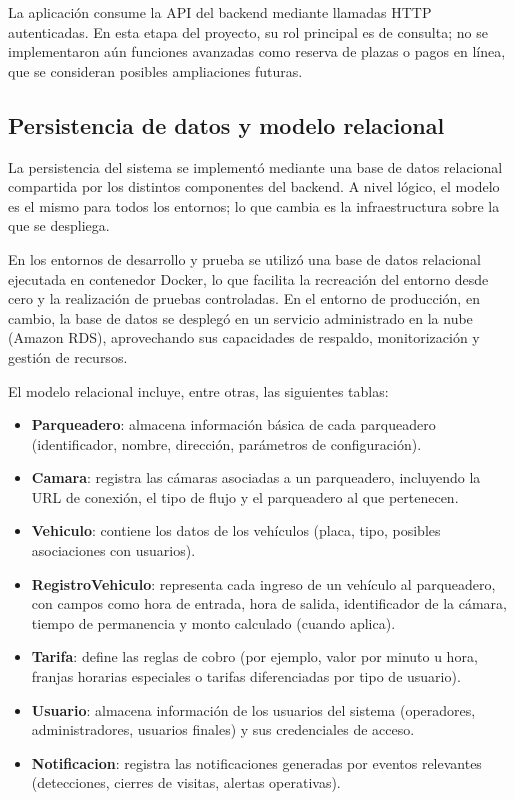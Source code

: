 La aplicación consume la API del backend mediante llamadas HTTP autenticadas. En esta etapa del proyecto, su rol principal es de consulta; no se implementaron aún funciones avanzadas como reserva de plazas o pagos en línea, que se consideran posibles ampliaciones futuras.
\subsection{Persistencia de datos y modelo relacional}

La persistencia del sistema se implementó mediante una base de datos relacional compartida por los distintos componentes del backend. A nivel lógico, el modelo es el mismo para todos los entornos; lo que cambia es la infraestructura sobre la que se despliega.

En los entornos de desarrollo y prueba se utilizó una base de datos relacional ejecutada en contenedor Docker, lo que facilita la recreación del entorno desde cero y la realización de pruebas controladas. En el entorno de producción, en cambio, la base de datos se desplegó en un servicio administrado en la nube (Amazon RDS), aprovechando sus capacidades de respaldo, monitorización y gestión de recursos.

El modelo relacional incluye, entre otras, las siguientes tablas:

\begin{itemize}
    \item \textbf{Parqueadero}: almacena información básica de cada parqueadero (identificador, nombre, dirección, parámetros de configuración).
    \item \textbf{Camara}: registra las cámaras asociadas a un parqueadero, incluyendo la URL de conexión, el tipo de flujo y el parqueadero al que pertenecen.
    \item \textbf{Vehiculo}: contiene los datos de los vehículos (placa, tipo, posibles asociaciones con usuarios).
    \item \textbf{RegistroVehiculo}: representa cada ingreso de un vehículo al parqueadero, con campos como hora de entrada, hora de salida, identificador de la cámara, tiempo de permanencia y monto calculado (cuando aplica).
    \item \textbf{Tarifa}: define las reglas de cobro (por ejemplo, valor por minuto u hora, franjas horarias especiales o tarifas diferenciadas por tipo de usuario).
    \item \textbf{Usuario}: almacena información de los usuarios del sistema (operadores, administradores, usuarios finales) y sus credenciales de acceso.
    \item \textbf{Notificacion}: registra las notificaciones generadas por eventos relevantes (detecciones, cierres de visitas, alertas operativas).
\end{itemize}

